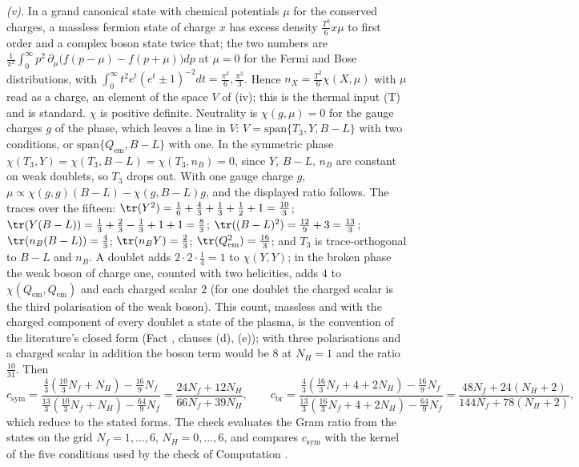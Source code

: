 \emph{(v).} In a grand canonical state with chemical potentials $\mu$ for the conserved charges, a massless fermion state of charge $x$ has excess density $\tfrac{T^{2}}{6}x\mu$ to first order and a complex boson state twice that; the two numbers are $\tfrac{1}{\pi^{2}}\int_{0}^{\infty}p^{2}\,\partial_{\mu}\bigl(f(p - \mu) - f(p + \mu)\bigr)dp$ at $\mu = 0$ for the Fermi and Bose distributions, with $\int_{0}^{\infty}t^{2}e^{t}(e^{t} \pm 1)^{-2}dt = \tfrac{\pi^{2}}{6}, \tfrac{\pi^{2}}{3}$. Hence $n_{X} = \tfrac{T^{2}}{6}\chi(X, \mu)$ with $\mu$ read as a charge, an element of the space $V$ of (iv); this is the thermal input (T) and is standard. $\chi$ is positive definite. Neutrality is $\chi(g, \mu) = 0$ for the gauge charges $g$ of the phase, which leaves a line in $V$: $V = \mathrm{span}\{T_{3}, Y, B - L\}$ with two conditions, or $\mathrm{span}\{Q_{\mathrm{em}}, B - L\}$ with one. In the symmetric phase $\chi(T_{3}, Y) = \chi(T_{3}, B - L) = \chi(T_{3}, n_{B}) = 0$, since $Y$, $B - L$, $n_{B}$ are constant on weak doublets, so $T_{3}$ drops out. With one gauge charge $g$, $\mu \propto \chi(g, g)(B - L) - \chi(g, B - L)g$, and the displayed ratio follows. The traces over the fifteen: $\tr(Y^{2}) = \tfrac16 + \tfrac43 + \tfrac13 + \tfrac12 + 1 = \tfrac{10}{3}$; $\tr(Y(B - L)) = \tfrac13 + \tfrac23 - \tfrac13 + 1 + 1 = \tfrac83$; $\tr((B - L)^{2}) = \tfrac{12}{9} + 3 = \tfrac{13}{3}$; $\tr(n_{B}(B - L)) = \tfrac43$; $\tr(n_{B}Y) = \tfrac23$; $\tr(Q_{\mathrm{em}}^{2}) = \tfrac{16}{3}$; and $T_{3}$ is trace-orthogonal to $B - L$ and $n_{B}$. A doublet adds $2 \cdot 2 \cdot \tfrac14 = 1$ to $\chi(Y, Y)$; in the broken phase the weak boson of charge one, counted with two helicities, adds $4$ to $\chi(Q_{\mathrm{em}}, Q_{\mathrm{em}})$ and each charged scalar $2$ (for one doublet the charged scalar is the third polarisation of the weak boson). This count, massless and with the charged component of every doublet a state of the plasma, is the convention of the literature's closed form (Fact , clauses (d), (e)); with three polarisations and a charged scalar in addition the boson term would be $8$ at $N_{H} = 1$ and the ratio $\tfrac{10}{31}$. Then
\[
c_{\mathrm{sym}} = \frac{\tfrac43(\tfrac{10}{3}N_{f} + N_{H}) - \tfrac{16}{9}N_{f}}{\tfrac{13}{3}(\tfrac{10}{3}N_{f} + N_{H}) - \tfrac{64}{9}N_{f}} = \frac{24N_{f} + 12N_{H}}{66N_{f} + 39N_{H}}, \qquad c_{\mathrm{br}} = \frac{\tfrac43(\tfrac{16}{3}N_{f} + 4 + 2N_{H}) - \tfrac{16}{9}N_{f}}{\tfrac{13}{3}(\tfrac{16}{3}N_{f} + 4 + 2N_{H}) - \tfrac{64}{9}N_{f}} = \frac{48N_{f} + 24(N_{H} + 2)}{144N_{f} + 78(N_{H} + 2)},
\]
which reduce to the stated forms. The check evaluates the Gram ratio from the states on the grid $N_{f} = 1, \dots, 6$, $N_{H} = 0, \dots, 6$, and compares $c_{\mathrm{sym}}$ with the kernel of the five conditions used by the check of Computation .

